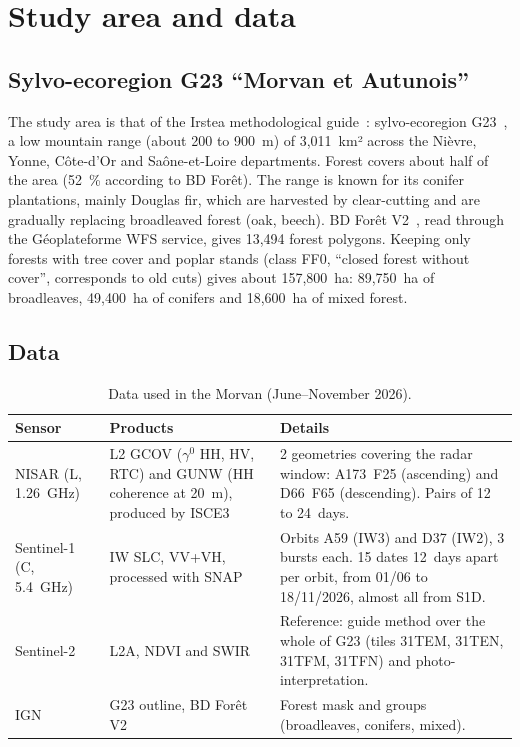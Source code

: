 \section{Study area and data}

\subsection{Sylvo-ecoregion G23 \enquote{Morvan et Autunois}}

The study area is that of the Irstea methodological guide~\cite{ose2015guide}: sylvo-ecoregion
G23~\cite{ign2011ser}, a low mountain range (about 200 to 900~m) of 3,011~km² across the Nièvre, Yonne,
Côte-d'Or and Saône-et-Loire departments. Forest covers about half of the area (52~\% according to BD Forêt). The
range is known for its conifer plantations, mainly Douglas fir, which are harvested by clear-cutting and are
gradually replacing broadleaved forest (oak, beech). BD Forêt V2~\cite{ign2024bdforet}, read through the
Géoplateforme WFS service, gives 13,494 forest polygons. Keeping only forests with tree cover and poplar stands
(class FF0, \enquote{closed forest without cover}, corresponds to old cuts) gives about 157,800~ha: 89,750~ha of
broadleaves, 49,400~ha of conifers and 18,600~ha of mixed forest.

\subsection{Data}

\begin{table}[htbp]
\centering\small
\caption{Data used in the Morvan (June--November 2026).}
\label{tab-data}
\begin{tabular}{p{2.7cm}p{5.4cm}p{6.7cm}}
\toprule
Sensor & Products & Details \\
\midrule
NISAR (L, 1.26~GHz) & L2 GCOV ($\gamma^0$ HH, HV, RTC) and GUNW (HH coherence at 20~m), produced by
ISCE3~\cite{isce3} & 2 geometries covering the radar window: A173~F25 (ascending) and D66~F65 (descending). Pairs of
12 to 24~days. \\
Sentinel-1 (C, 5.4~GHz) & IW SLC, VV+VH, processed with SNAP~\cite{snap} & Orbits A59 (IW3) and D37 (IW2), 3 bursts
each. 15 dates 12~days apart per orbit, from 01/06 to 18/11/2026, almost all from S1D. \\
Sentinel-2~\cite{drusch2012sentinel2} & L2A, NDVI and SWIR & Reference: guide method over the whole of G23 (tiles
31TEM, 31TEN, 31TFM, 31TFN) and photo-interpretation. \\
IGN & G23 outline, BD Forêt V2 & Forest mask and groups (broadleaves, conifers, mixed). \\
\bottomrule
\end{tabular}
\end{table}

